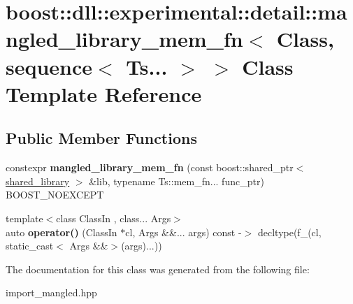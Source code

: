 \hypertarget{a01676}{}\section{boost\+:\+:dll\+:\+:experimental\+:\+:detail\+:\+:mangled\+\_\+library\+\_\+mem\+\_\+fn$<$ Class, sequence$<$ Ts... $>$ $>$ Class Template Reference}
\label{a01676}
\subsection*{Public Member Functions}
\begin{DoxyCompactItemize}
\item 
\mbox{\label{a01676_a4491764fc9b04a318c835645b4e199c6}} 
constexpr {\bfseries mangled\+\_\+library\+\_\+mem\+\_\+fn} (const boost\+::shared\+\_\+ptr$<$ \hyperlink{a01708}{shared\+\_\+library} $>$ \&lib, typename Ts\+::mem\+\_\+fn... func\+\_\+ptr) B\+O\+O\+S\+T\+\_\+\+N\+O\+E\+X\+C\+E\+PT
\item 
\mbox{\label{a01676_acd5c0f12a6d450863c61635201751aee}} 
{\footnotesize template$<$class Class\+In , class... Args$>$ }\\auto {\bfseries operator()} (Class\+In $\ast$cl, Args \&\&... args) const -\/$>$ decltype(f\+\_\+(cl, static\+\_\+cast$<$ Args \&\&$>$(args)...))
\end{DoxyCompactItemize}


The documentation for this class was generated from the following file\+:\begin{DoxyCompactItemize}
\item 
import\+\_\+mangled.\+hpp\end{DoxyCompactItemize}
